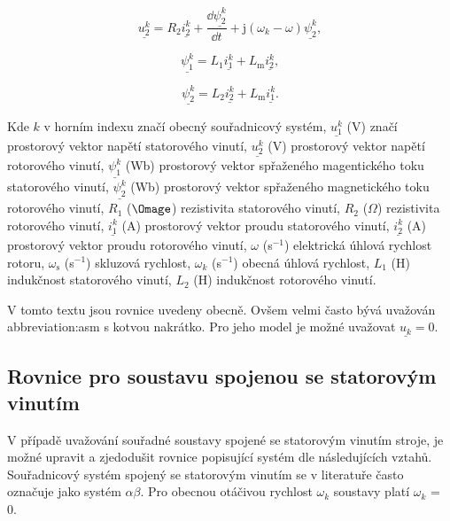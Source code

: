 \documentclass[a4paper, twoside, 11pt]{article}
\begin{document}
    \begin{equation}
        \underline{u_{2}^{k}} = R_2 \underline{i_2^{k}} + \frac{\dd{\underline{\psi_2^{k}}}}{\dd{t}} + \text{j} (\omega_k - \omega) \underline{\psi_2^{k}},
    \end{equation}

    \begin{equation}
        \underline{\psi_1^{k}} = L_1 \underline{i_1^{k}} + L_\text{m} \underline{i_2^{k}},
    \end{equation}

    \begin{equation}
        \underline{\psi_2^{k}} = L_2 \underline{i_2^{k}} + L_\text{m} \underline{i_1^{k}}.
    \end{equation}

    Kde $k$ v horním indexu značí obecný souřadnicový systém, $\underline{u_{1}^{k}}$ (V) značí prostorový vektor napětí statorového vinutí, $\underline{u_{2}^{k}}$ (V) prostorový vektor napětí rotorového vinutí, $\underline{\psi_1^{k}}$ (Wb) prostorový vektor spřaženého magentického toku statorového vinutí, $\underline{\psi_2^{k}}$ (Wb) prostorový vektor spřaženého magnetického toku rotorového vinutí, $R_1$ ($\Omage$) rezistivita statorového vinutí, $R_2$ ($\Omega$) rezistivita rotorového vinutí, $\underline{i_1^{k}}$ (A) prostorový vektor proudu statorového vinutí, $\underline{i_2^{k}}$ (A) prostorový vektor proudu rotorového vinutí, $\omega$ (s$^{-1}$) elektrická úhlová rychlost rotoru, $\omega_\text{s}$ (s$^{-1}$) skluzová rychlost, $\omega_k$ (s$^{-1}$) obecná úhlová rychlost, $L_1$ (H) indukčnost statorového vinutí, $L_2$ (H) indukčnost rotorového vinutí.\par

    V tomto textu jsou rovnice uvedeny obecně. Ovšem velmi často bývá uvažován \gls{abbreviation:asm} s kotvou nakrátko. Pro jeho model je možné uvažovat $\underline{u_k} = 0$.\par


    \subsection{Rovnice pro soustavu spojenou se statorovým vinutím}
    V případě uvažování souřadné soustavy spojené se statorovým vinutím stroje, je možné upravit a zjedodušit rovnice popisující systém dle následujících vztahů. Souřadnicový systém spojený se statorovým vinutím se v literatuře často označuje jako systém $\alpha\beta$. Pro obecnou otáčivou rychlost $\omega_k$ soustavy platí $\omega_k$ = 0.
\end{document}
